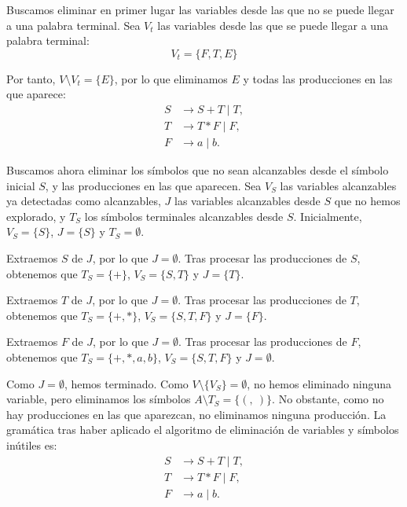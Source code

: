 \documentclass[12pt]{article}
\begin{document}
\begin{ejercicio}[2.5 puntos]
\begin{description}
        Buscamos eliminar en primer lugar las variables desde las que no se puede llegar a una palabra terminal. Sea $V_t$ las variables desde las que se puede llegar a una palabra terminal:
        \begin{equation*}
            V_t = \{F,T,E\}
        \end{equation*}

        Por tanto, $V\setminus V_t = \{E\}$, por lo que eliminamos $E$ y todas las producciones en las que aparece:
        \begin{align*}
            S &\to S + T \mid T, \\
            T &\to T * F \mid F, \\
            F &\to a \mid b.
        \end{align*}

        Buscamos ahora eliminar los símbolos que no sean alcanzables desde el símbolo inicial $S$, y las producciones en las que aparecen.
        Sea $V_S$ las variables alcanzables ya detectadas como alcanzables, $J$ las variables alcanzables desde $S$ que no hemos explorado, y $T_S$ los símbolos terminales alcanzables desde $S$.
        Inicialmente, $V_S = \{S\}$, $J = \{S\}$ y $T_S = \emptyset$.

        Extraemos $S$ de $J$, por lo que $J=\emptyset$. Tras procesar las producciones de $S$, obtenemos que $T_S = \{+\}$, $V_S = \{S,T\}$ y $J = \{T\}$.

        Extraemos $T$ de $J$, por lo que $J=\emptyset$. Tras procesar las producciones de $T$, obtenemos que $T_S = \{+,*\}$, $V_S = \{S,T,F\}$ y $J = \{F\}$.

        Extraemos $F$ de $J$, por lo que $J=\emptyset$. Tras procesar las producciones de $F$, obtenemos que $T_S = \{+,*,a,b\}$, $V_S = \{S,T,F\}$ y $J = \emptyset$.

        Como $J = \emptyset$, hemos terminado. Como $V\setminus \{V_S\} = \emptyset$, no hemos eliminado ninguna variable, pero eliminamos los símbolos $A\setminus T_S = \{(,~)\}$.
        No obstante, como no hay producciones en las que aparezcan, no eliminamos ninguna producción. La gramática tras haber aplicado el algoritmo de eliminación de variables y símbolos inútiles es:
        \begin{align*}
            S &\to S + T \mid T, \\
            T &\to T * F \mid F, \\
            F &\to a \mid b.
        \end{align*}


\end{description}
\end{ejercicio}
\end{document}
